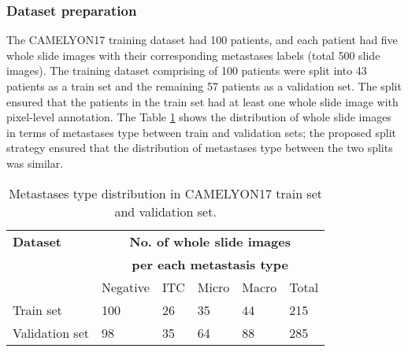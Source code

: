 \documentclass[times,twocolumn,final,authoryear]{tmp}
\begin{document}
\subsubsection{Dataset preparation}
The CAMELYON17 training dataset had 100 patients, and each patient had five whole slide images with their corresponding metastases labels (total 500 slide images).  The training dataset comprising of 100 patients were split into 43 patients as a train set and the remaining 57 patients as a validation set. The split ensured that the patients in the train set had at least one whole slide image with pixel-level annotation. The Table \ref{path_tab:cm17-datasplit} shows the distribution of whole slide images in terms of metastases type between train and validation sets; the proposed split strategy ensured that the distribution of metastases type between the two splits was similar.

\begin{table}
\centering
\caption{Metastases type distribution in CAMELYON17 train set and validation set.}
\label{path_tab:cm17-datasplit}
\begin{tabular}{@{}llllll@{}}
  
\textbf{Dataset} & \multicolumn{5}{c}{\textbf{No. of whole slide images}}\\
                 &  \multicolumn{5}{c}{\textbf{per each metastasis type}} \\    
                 & Negative       & ITC       & Micro      & Macro      & Total      \\
Train set        & 100            & 26        & 35         & 44         & 215        \\
Validation set   & 98             & 35        & 64         & 88         & 285        \\  
\end{tabular}\end{table}
\end{document}
